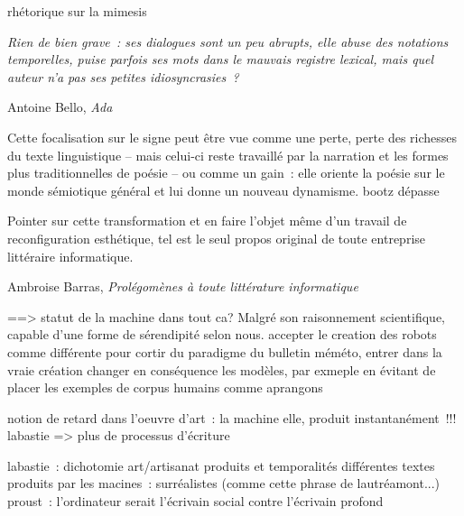 \documentclass{article}
\newenvironment{citationbox}
{\begin{center}
		\begin{minipage}{.8\textwidth}
		}
		{
		\end{minipage}	
\end{center}
}
\begin{document}
				rhétorique sur la mimesis
				\begin{citationbox}
					\textit{Rien de bien grave~: ses dialogues sont un peu abrupts, elle abuse des notations temporelles, puise parfois ses mots dans le mauvais registre lexical, mais quel auteur n'a pas ses petites idiosyncrasies~?}
					\begin{flushright}
						Antoine Bello, \textit{Ada} \cite{bello2016}
					\end{flushright}
				\end{citationbox}
				\begin{citationbox}
					Cette focalisation sur le signe peut être vue comme une perte, perte des richesses du
					texte linguistique -- mais celui-ci reste travaillé par la narration et les formes plus
					traditionnelles de poésie -- ou comme un gain~: elle oriente la poésie sur le monde sémiotique
					général et lui donne un nouveau dynamisme. 
					bootz dépasse
				\end{citationbox}
				\begin{citationbox}
					Pointer sur cette transformation et en faire l'objet même d'un travail
					de reconfiguration esthétique, tel est le seul propos original de toute
					entreprise littéraire informatique.
					\begin{flushright}
						Ambroise Barras, \textit{Prolégomènes à toute littérature informatique} \cite{barras1995}
					\end{flushright}
				\end{citationbox}
				
				==> statut de la machine dans tout ca? Malgré son raisonnement scientifique, capable d'une forme de sérendipité selon nous. 
				accepter le creation des robots comme différente pour cortir du paradigme du bulletin méméto, entrer dans la vraie création
				changer en conséquence les modèles, par exmeple en évitant de placer les exemples de corpus humains comme aprangons
			
		
		
	
		
		
		
		
		notion de retard dans l'oeuvre d'art : la machine elle, produit instantanément !!! labastie => plus de processus d'écriture
		
		labastie : dichotomie art/artisanat produits et temporalités différentes
		textes produits par les macines : surréalistes (comme cette phrase de lautréamont...)
		proust : l'ordinateur serait l'écrivain social contre l'écrivain profond
		
\end{document}
